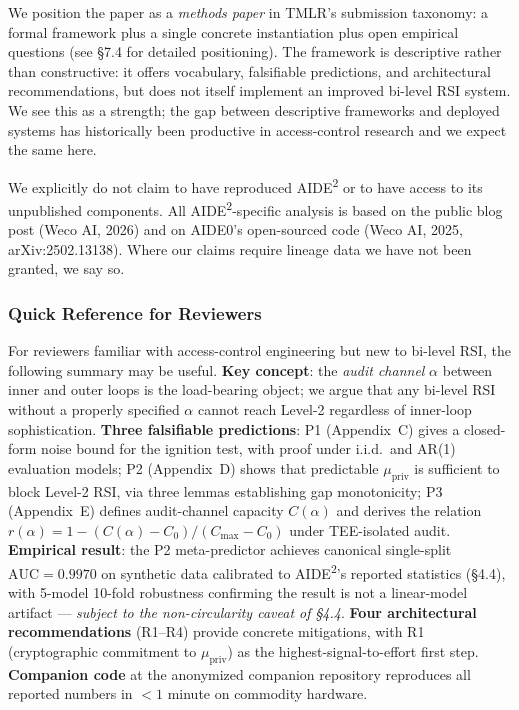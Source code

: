 We position the paper as a \emph{methods paper} in TMLR's submission taxonomy: a formal framework plus a single concrete instantiation plus open empirical questions (see \S7.4 for detailed positioning). The framework is descriptive rather than constructive: it offers vocabulary, falsifiable predictions, and architectural recommendations, but does not itself implement an improved bi-level RSI system. We see this as a strength; the gap between descriptive frameworks and deployed systems has historically been productive in access-control research and we expect the same here.

We explicitly do not claim to have reproduced AIDE\textsuperscript{2} or to have access to its unpublished components. All AIDE\textsuperscript{2}-specific analysis is based on the public blog post (Weco AI, 2026) and on AIDE0's open-sourced code (Weco AI, 2025, arXiv:2502.13138). Where our claims require lineage data we have not been granted, we say so.

\subsubsection{Quick Reference for Reviewers}

For reviewers familiar with access-control engineering but new to bi-level RSI, the following summary may be useful. \textbf{Key concept}: the \emph{audit channel} $\alpha$ between inner and outer loops is the load-bearing object; we argue that any bi-level RSI without a properly specified $\alpha$ cannot reach Level-2 regardless of inner-loop sophistication. \textbf{Three falsifiable predictions}: P1 (Appendix~C) gives a closed-form noise bound for the ignition test, with proof under i.i.d.\ and AR(1) evaluation models; P2 (Appendix~D) shows that predictable $\mu_{\text{priv}}$ is sufficient to block Level-2 RSI, via three lemmas establishing gap monotonicity; P3 (Appendix~E) defines audit-channel capacity $C(\alpha)$ and derives the relation $r(\alpha) = 1 - (C(\alpha) - C_0)/(C_{\max} - C_0)$ under TEE-isolated audit. \textbf{Empirical result}: the P2 meta-predictor achieves canonical single-split $\text{AUC} = 0.9970$ on synthetic data calibrated to AIDE\textsuperscript{2}'s reported statistics (\S4.4), with 5-model 10-fold robustness confirming the result is not a linear-model artifact --- \emph{subject to the non-circularity caveat of \S4.4}. \textbf{Four architectural recommendations} (R1--R4) provide concrete mitigations, with R1 (cryptographic commitment to $\mu_{\text{priv}}$) as the highest-signal-to-effort first step. \textbf{Companion code} at the anonymized companion repository reproduces all reported numbers in $<1$ minute on commodity hardware.
